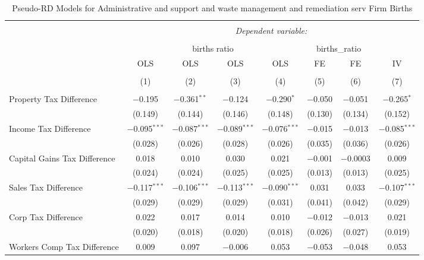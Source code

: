 
\begin{table}[!htbp] \centering 
  \caption{Pseudo-RD Models for  Administrative and support and waste management and remediation serv Firm Births} 
  \label{} 
\begin{tabular}{@{\extracolsep{5pt}}lccccccc} 
\\[-1.8ex]\hline 
\hline \\[-1.8ex] 
 & \multicolumn{7}{c}{\textit{Dependent variable:}} \\ 
\cline{2-8} 
\\[-1.8ex] & \multicolumn{4}{c}{births ratio} & \multicolumn{2}{c}{births\_ratio} &   \\ 
 & OLS & OLS & OLS & OLS & FE & FE & IV \\ 
\\[-1.8ex] & (1) & (2) & (3) & (4) & (5) & (6) & (7)\\ 
\hline \\[-1.8ex] 
 Property Tax Difference & $-$0.195 & $-$0.361$^{**}$ & $-$0.124 & $-$0.290$^{*}$ & $-$0.050 & $-$0.051 & $-$0.265$^{*}$ \\ 
  & (0.149) & (0.144) & (0.146) & (0.148) & (0.130) & (0.134) & (0.152) \\ 
  Income Tax Difference & $-$0.095$^{***}$ & $-$0.087$^{***}$ & $-$0.089$^{***}$ & $-$0.076$^{***}$ & $-$0.015 & $-$0.013 & $-$0.085$^{***}$ \\ 
  & (0.028) & (0.026) & (0.028) & (0.026) & (0.035) & (0.036) & (0.026) \\ 
  Capital Gains Tax Difference & 0.018 & 0.010 & 0.030 & 0.021 & $-$0.001 & $-$0.0003 & 0.009 \\ 
  & (0.024) & (0.024) & (0.025) & (0.025) & (0.013) & (0.013) & (0.025) \\ 
  Sales Tax Difference & $-$0.117$^{***}$ & $-$0.106$^{***}$ & $-$0.113$^{***}$ & $-$0.090$^{***}$ & 0.031 & 0.033 & $-$0.107$^{***}$ \\ 
  & (0.029) & (0.029) & (0.029) & (0.031) & (0.041) & (0.042) & (0.029) \\ 
  Corp Tax Difference & 0.022 & 0.017 & 0.014 & 0.010 & $-$0.012 & $-$0.013 & 0.021 \\ 
  & (0.020) & (0.018) & (0.020) & (0.018) & (0.026) & (0.027) & (0.019) \\ 
  Workers Comp Tax Difference & 0.009 & 0.097 & $-$0.006 & 0.053 & $-$0.053 & $-$0.048 & 0.053 \\ 

\end{tabular}
\end{table}
